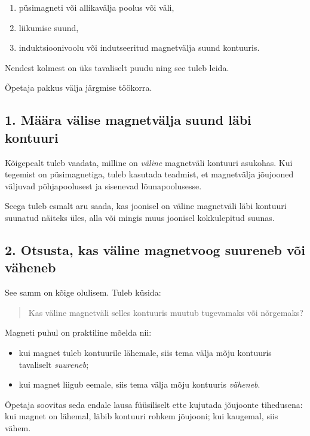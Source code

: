 \documentclass[a4paper,11pt]{article}
\begin{document}
\begin{enumerate}
    \item püsimagneti või allikavälja poolus või väli,
    \item liikumise suund,
    \item induktsioonivoolu või indutseeritud magnetvälja suund kontuuris.
\end{enumerate}

Nendest kolmest on üks tavaliselt puudu ning see tuleb leida.

Õpetaja pakkus välja järgmise töökorra.

\subsection{1. Määra välise magnetvälja suund läbi kontuuri}

Kõigepealt tuleb vaadata, milline on \emph{väline} magnetväli kontuuri asukohas. Kui tegemist on püsimagnetiga, tuleb kasutada teadmist, et magnetvälja jõujooned väljuvad põhjapoolusest ja sisenevad lõunapoolusesse.

Seega tuleb esmalt aru saada, kas joonisel on väline magnetväli läbi kontuuri suunatud näiteks üles, alla või mingis muus joonisel kokkulepitud suunas.

\subsection{2. Otsusta, kas väline magnetvoog suureneb või väheneb}

See samm on kõige olulisem. Tuleb küsida:

\begin{quote}
Kas väline magnetväli selles kontuuris muutub tugevamaks või nõrgemaks?
\end{quote}

Magneti puhul on praktiline mõelda nii:

\begin{itemize}
    \item kui magnet tuleb kontuurile lähemale, siis tema välja mõju kontuuris tavaliselt \emph{suureneb};
    \item kui magnet liigub eemale, siis tema välja mõju kontuuris \emph{väheneb}.
\end{itemize}

Õpetaja soovitas seda endale lausa füüsiliselt ette kujutada jõujoonte tihedusena: kui magnet on lähemal, läbib kontuuri rohkem jõujooni; kui kaugemal, siis vähem.
\end{document}
